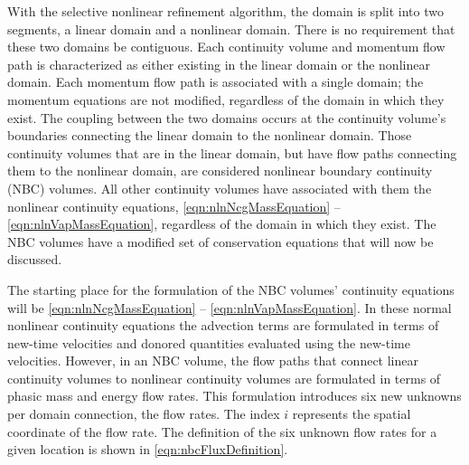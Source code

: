 With the selective nonlinear refinement algorithm, the domain is split into two segments, a linear domain and a nonlinear domain.
There is no requirement that these two domains be contiguous.
Each continuity volume and momentum flow path is characterized as either existing in the linear domain or the nonlinear domain.
Each momentum flow path is associated with a single domain; the momentum equations are not modified, regardless of the domain in which they exist.
The coupling between the two domains occurs at the continuity volume's boundaries connecting the linear domain  to the nonlinear domain.
Those continuity volumes that are in the linear domain, but have flow paths connecting them to the nonlinear domain, are considered nonlinear boundary continuity (NBC) volumes.
All other continuity volumes have associated with them the nonlinear continuity equations, \eqref{eqn:nlnNcgMassEquation} -- \eqref{eqn:nlnVapMassEquation}, regardless of the domain in which they exist.
The NBC volumes have a modified set of conservation equations that will now be discussed.

The starting place for the formulation of the NBC volumes' continuity equations will be \eqref{eqn:nlnNcgMassEquation} -- \eqref{eqn:nlnVapMassEquation}.
In these normal nonlinear continuity equations the advection terms are formulated in terms of new-time velocities and donored quantities evaluated using the new-time velocities.
However, in an NBC volume, the flow paths that connect linear continuity volumes to nonlinear continuity volumes are formulated in terms of phasic mass and energy flow rates.
This formulation introduces six new unknowns per domain connection, the flow rates.
The index $i$ represents the spatial coordinate of the flow rate.
The definition of the six unknown flow rates for a given location is shown in \eqref{eqn:nbcFluxDefinition}.

